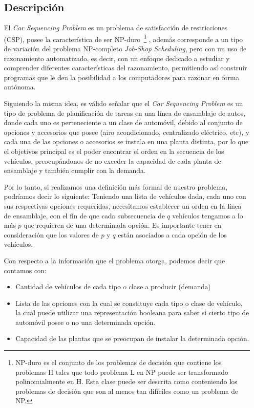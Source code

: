 \subsection{Descripción}
El \emph{Car Sequencing Problem} es un problema de satisfacción de restricciones (CSP), posee la
característica de ser NP-duro~\footnote{
NP-duro es el conjunto de los problemas de decisión que contiene los problemas H
tales que todo problema L en NP puede ser transformado polinomialmente en H.
Esta clase puede ser descrita como conteniendo los problemas de decisión que son
al menos tan difíciles como un problema de NP.}
, además corresponde a un tipo de variación del problema NP-completo \emph{Job-Shop Scheduling},
pero con un uso de razonamiento automatizado, es decir, con un enfoque dedicado a estudiar y comprender
diferentes características del razonamiento, permitiendo así construir programas que le den la posibilidad
a los computadores para razonar en forma autónoma.

Siguiendo la misma idea, es válido señalar que el \emph{Car Sequencing Problem} es un tipo de problema de planificación
de tareas en una línea de ensamblaje de autos, donde cada uno es perteneciente a un clase de automóvil, debido al conjunto
de opciones y accesorios que posee (airo acondicionado, centralizado eléctrico, etc), y cada una de las opciones o
accesorios se instala en una planta distinta, por lo que el objetivos principal es el poder encontrar el orden en la
secuencia de los vehículos, preocupándonos de no exceder la capacidad de cada planta de ensamblaje y también cumplir con la demanda.

Por lo tanto, si realizamos una definición más formal de nuestro problema, podríamos decir lo siguiente:
Teniendo una lista de vehículos dada, cada uno con sus respectivas opciones requeridas,
necesitamos establecer un orden en la línea de ensamblaje, con el fin de que cada subsecuencia de $q$ vehículos
tengamos a lo más $p$ que requieren de una determinada opción. Es importante tener en consideración que los
valores de $p$ y $q$ están asociados a cada opción de los vehículos.

Con respecto a la información que el problema otorga, podemos decir que contamos con:
\begin{itemize}
    \item Cantidad de vehículos de cada tipo o clase a producir (demanda)
    \item Lista de las opciones con la cual se constituye cada tipo o clase de vehículo, la cual puede utilizar una representación
        booleana para saber si cierto tipo de automóvil posee o no una determinada opción.
    \item Capacidad de las plantas que se preocupan de instalar la determinada opción.
\end{itemize}

